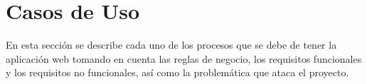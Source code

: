\section{Casos de Uso}
En esta sección se describe cada uno de los procesos que se debe de tener la aplicación web tomando en cuenta las reglas de negocio, los requisitos funcionales y los requisitos no funcionales, así como la problemática que ataca el proyecto.









